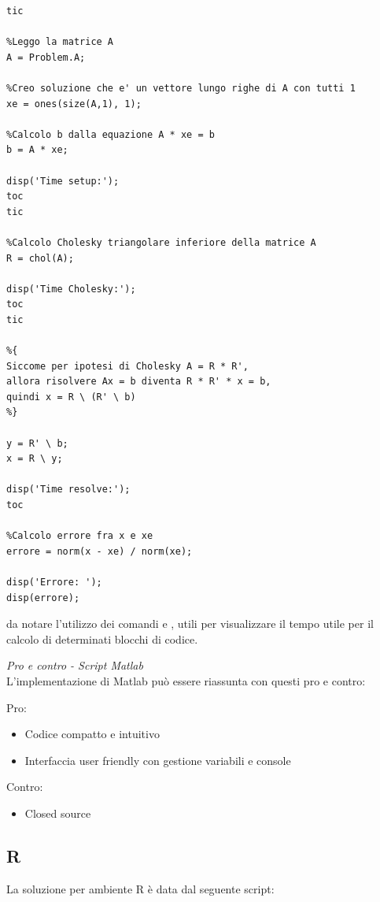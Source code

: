 \documentclass[preprint,12pt]{elsarticle}
\begin{document}
\begin{lstlisting}
tic

%Leggo la matrice A
A = Problem.A;

%Creo soluzione che e' un vettore lungo righe di A con tutti 1
xe = ones(size(A,1), 1);

%Calcolo b dalla equazione A * xe = b
b = A * xe;

disp('Time setup:');
toc
tic

%Calcolo Cholesky triangolare inferiore della matrice A 
R = chol(A);

disp('Time Cholesky:');
toc
tic

%{
Siccome per ipotesi di Cholesky A = R * R',
allora risolvere Ax = b diventa R * R' * x = b,
quindi x = R \ (R' \ b)
%}

y = R' \ b;
x = R \ y;

disp('Time resolve:');
toc

%Calcolo errore fra x e xe
errore = norm(x - xe) / norm(xe);

disp('Errore: ');
disp(errore);

\end{lstlisting}

da notare l'utilizzo dei comandi  e , utili per visualizzare il tempo utile per il calcolo di determinati blocchi di codice.
\linebreak


\textit{Pro e contro - Script Matlab}\\
\vspace{4mm}
L'implementazione di Matlab può essere riassunta con questi pro e contro:

Pro:
\begin{itemize}
	\item Codice compatto e intuitivo
	\item Interfaccia user friendly con gestione variabili e console
\end{itemize}

Contro:
\begin{itemize}
	\item Closed source
\end{itemize}

\newpage

\subsection*{R}

La soluzione per ambiente R è data dal seguente script:
\end{document}
